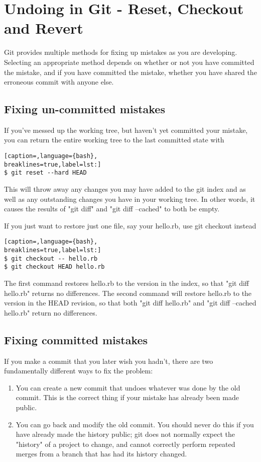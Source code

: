 \section{Undoing in Git - Reset, Checkout and Revert}
Git provides multiple methods for fixing up mistakes as you are developing.
Selecting an appropriate method depends on whether or not you have committed
the mistake, and if you have committed the mistake, whether you have shared the
erroneous commit with anyone else.

\subsection{Fixing un-committed mistakes}
If you've messed up the working tree, but haven't yet committed your mistake,
you can return the entire working tree to the last committed state with
\lstset{basicstyle=\scriptsize, numbers=none, captionpos=b, tabsize=4}
\begin{lstlisting}[caption=,language={bash},
breaklines=true,label=lst:]
$ git reset --hard HEAD
\end{lstlisting}

This will throw away any changes you may have added to the git index and as
well as any outstanding changes you have in your working tree. In other words,
it causes the results of "git diff" and "git diff --cached" to both be empty.

If you just want to restore just one file, say your hello.rb, use git checkout
instead
\lstset{basicstyle=\scriptsize, numbers=none, captionpos=b, tabsize=4}
\begin{lstlisting}[caption=,language={bash},
breaklines=true,label=lst:]
$ git checkout -- hello.rb
$ git checkout HEAD hello.rb
\end{lstlisting}

The first command restores hello.rb to the version in the index, so that "git
diff hello.rb" returns no differences. The second command will restore hello.rb
to the version in the HEAD revision, so that both "git diff hello.rb" and "git
diff --cached hello.rb" return no differences.

\subsection{Fixing committed mistakes}
If you make a commit that you later wish you hadn't, there are two
fundamentally different ways to fix the problem:
\begin{enumerate}
\item You can create a new commit that undoes whatever was done by the old commit.
This is the correct thing if your mistake has already been made public.

\item You can go back and modify the old commit. You should never do this if you have
already made the history public; git does not normally expect the "history" of
a project to change, and cannot correctly perform repeated merges from a branch
that has had its history changed.
\end{enumerate}

